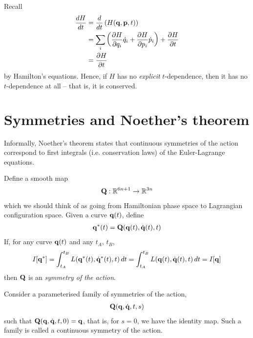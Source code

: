 \documentclass{../../template/note}
\begin{document}
    \begin{remark*}
        Recall
        \begin{align*}
            \frac{dH}{dt} &= \frac{d}{dt}\left(H(\V q, \V p, t)\right) \\
            &= \sum_i \left(\pd{H}{q_i} \dot q_i + \pd{H}{p_i} \dot p_i\right) + \pd{H}{t} \\
            &= \pd{H}{t}
        \end{align*}
        by Hamilton's equations. Hence, if $H$ has no \emph{explicit} $t$-dependence, then it has no $t$-dependence at all -- that is, it is conserved.        
    \end{remark*}
    
    \section{Symmetries and Noether's theorem}

    Informally, Noether's theorem states that continuous symmetries of the action correspond to first integrals (i.e. conservation laws) of the Euler-Lagrange equations.

    \begin{definition}
        Define a smooth map
        \begin{align*}
            \V Q: \RR^{6n+1} \to \RR^{3n}
        \end{align*}
        which we should think of as going from Hamiltonian phase space to Lagrangian configuration space. Given a curve $\V q(t)$, define
        \begin{align*}
            \V q^*(t) = \V Q(\V q(t), \dot{\V q}(t), t)
        \end{align*}
        If, for any curve $\V q(t)$ and any $t_A$, $t_B$,
        \begin{align*}
            I[\V q^*] = \int_{t_A}^{t_B} L(\V q^*(t), \dot{\V q}^*(t), t) \D t = \int_{t_A}^{t_B} L(\V q(t), \dot{\V q}(t), t) \D t = I[\V q]
        \end{align*}
        then $\V Q$ is an \emph{symmetry of the action}.        
    \end{definition}
    
    \begin{definition}
        Consider a parameterised family of symmetries of the action,
        \begin{align*}
            \V Q(\V q, \dot{\V q}, t, s)
        \end{align*}
        such that $\V Q(\V q, \dot{\V q}, t, 0) = \V q$, that is, for $s=0$, we have the identity map. Such a family is called a continuous symmetry of the action.  
    \end{definition}
    
\end{document}
